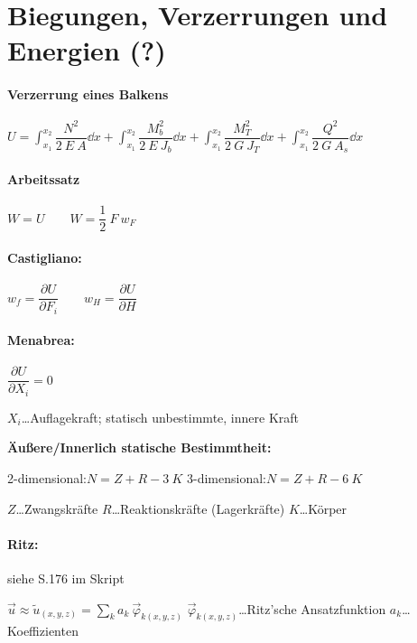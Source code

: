 \section{Biegungen, Verzerrungen und Energien (?)}

\paragraph{Verzerrung eines Balkens}
	$ U = \displaystyle\int_{x_1}^{x_2} \dfrac{N^2}  {2\ E\ A}   \dd x
	    + \displaystyle\int_{x_1}^{x_2} \dfrac{M_b^2}{2\ E\ J_b} \dd x 
	    + \displaystyle\int_{x_1}^{x_2} \dfrac{M_T^2}{2\ G\ J_T} \dd x 
	    + \displaystyle\int_{x_1}^{x_2} \dfrac{Q^2}  {2\ G\ A_s} \dd x $

\paragraph{Arbeitssatz}
	$ W = U \qquad 
		W = \dfrac{1}{2}\ F\ w_F$

\paragraph{Castigliano:}
	$ w_f  = \dfrac{\partial U}{\partial F_i} \qquad w_H = \dfrac{\partial U}{\partial H} $
	
\paragraph{Menabrea:}
	$ \dfrac{\partial U}{\partial X_i} = 0 $
		
		\vskip 3pt
	$ X_i $\dots Auflagekraft; statisch unbestimmte, innere Kraft
	
	\textbf{Äußere/Innerlich statische Bestimmtheit:}
	
	2-dimensional:\quad $ N = Z + R - 3\ K $
		\hfil 3-dimensional:\quad $ N = Z + R - 6\ K $ \hfil
	
	$ Z $\dots Zwangskräfte
		\qquad $ R $\dots Reaktionskräfte (Lagerkräfte)
		\qquad $ K $\dots Körper
	
\paragraph{Ritz:} \quad siehe S.176 im Skript
	
	$ \vec{u} \approx \tilde{u}_{(x,y,z)} = \displaystyle\sum_k a_k\ \vec{\varphi}_{k(x,y,z)} $
		\qquad $ \vec{\varphi}_{k(x,y,z)} $\dots Ritz'sche Ansatzfunktion
		\qquad $ a_k $\dots Koeffizienten
	
